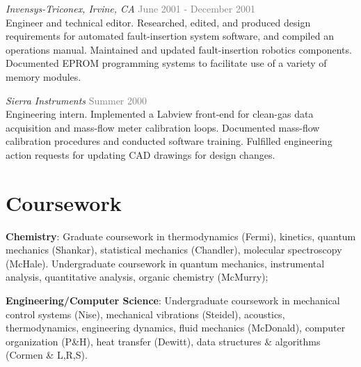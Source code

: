 \documentclass[margin,line]{res}
\begin{document}
\begin{resume}

\emph{Invensys-Triconex, Irvine, CA} \hfill {\textcolor{gray}{June 2001 - December 2001}} \\
Engineer and technical editor. Researched, edited, and produced design requirements for automated fault-insertion system software, and compiled an operations manual. Maintained and updated fault-insertion robotics components. Documented EPROM programming systems to facilitate use of a variety of memory modules. 


\emph{Sierra Instruments} \hfill {\textcolor{gray}{Summer 2000}} \\
Engineering intern. Implemented a Labview front-end for clean-gas data acquisition and mass-flow meter calibration loops. Documented mass-flow calibration procedures and conducted software training. Fulfilled engineering action requests for updating CAD drawings for design changes.


\section{\sc Coursework}

\textbf{Chemistry}: Graduate coursework in thermodynamics (Fermi), kinetics, quantum mechanics (Shankar), statistical mechanics (Chandler), molecular spectroscopy (McHale). Undergraduate coursework in quantum mechanics, instrumental analysis, quantitative analysis, organic chemistry (McMurry); 
\vspace*{-.1in}

\textbf{Engineering/Computer Science}: Undergraduate coursework in mechanical control systems (Nise), mechanical vibrations (Steidel), acoustics, thermodynamics, engineering dynamics, fluid mechanics (McDonald), computer organization (P\&H), heat transfer (Dewitt), data structures \& algorithms (Cormen \& L,R,S). 


\end{resume}
\end{document}
